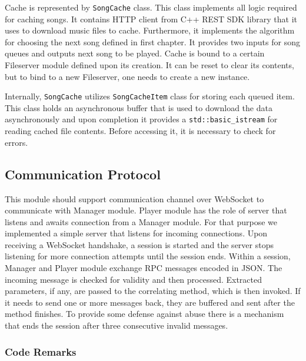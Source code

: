 Cache is represented by \texttt{SongCache} class. This class implements all logic required for caching songs. It contains HTTP client from C++ REST SDK library that it uses to download music files to cache. Furthermore, it implements the algorithm for choosing the next song defined in first chapter. It provides two inputs for song queues and outputs next song to be played. Cache is bound to a certain Fileserver module defined upon its creation. It can be reset to clear its contents, but to bind to a new Fileserver, one needs to create a new instance.
\par
Internally, \texttt{SongCache} utilizes \texttt{SongCacheItem} class for storing each queued item. This class holds an asynchronous buffer that is used to download the data asynchronously and upon completion it provides a \texttt{std::basic\_istream} for reading cached file contents. Before accessing it, it is necessary to check for errors.

\subsection{Communication Protocol}

This module should support communication channel over WebSocket to communicate with Manager module. Player module has the role of server that listens and awaits connection from a Manager module. For that purpose we implemented a simple server that listens for incoming connections. Upon receiving a WebSocket handshake, a session is started and the server stops listening for more connection attempts until the session ends. Within a session, Manager and Player module exchange RPC messages encoded in JSON. The incoming message is checked for validity and then processed. Extracted parameters, if any, are passed to the correlating method, which is then invoked. If it needs to send one or more messages back, they are buffered and sent after the method finishes. To provide some defense against abuse there is a mechanism that ends the session after three consecutive invalid messages. 

\subsubsection{Code Remarks}


